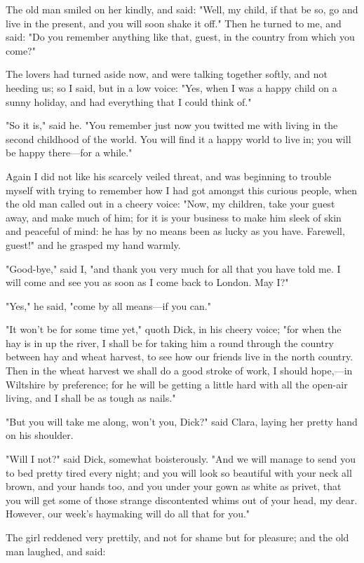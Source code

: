 The old man smiled on her kindly, and said: "Well, my child, if that be
so, go and live in the present, and you will soon shake it off." Then he
turned to me, and said: "Do you remember anything like that, guest, in
the country from which you come?"

The lovers had turned aside now, and were talking together softly, and
not heeding us; so I said, but in a low voice: "Yes, when I was a happy
child on a sunny holiday, and had everything that I could think of."

"So it is," said he. "You remember just now you twitted me with living
in the second childhood of the world. You will find it a happy world to
live in; you will be happy there---for a while."

Again I did not like his scarcely veiled threat, and was beginning to
trouble myself with trying to remember how I had got amongst this
curious people, when the old man called out in a cheery voice: "Now, my
children, take your guest away, and make much of him; for it is your
business to make him sleek of skin and peaceful of mind: he has by no
means been as lucky as you have. Farewell, guest!" and he grasped my
hand warmly.

"Good-bye," said I, "and thank you very much for all that you have told
me. I will come and see you as soon as I come back to London. May I?"

"Yes," he said, "come by all means---if you can."

"It won't be for some time yet," quoth Dick, in his cheery voice; "for
when the hay is in up the river, I shall be for taking him a round
through the country between hay and wheat harvest, to see how our
friends live in the north country. Then in the wheat harvest we shall do
a good stroke of work, I should hope,---in Wiltshire by preference; for
he will be getting a little hard with all the open-air living, and I
shall be as tough as nails."

"But you will take me along, won't you, Dick?" said Clara, laying her
pretty hand on his shoulder.

"Will I not?" said Dick, somewhat boisterously. "And we will manage to
send you to bed pretty tired every night; and you will look so beautiful
with your neck all brown, and your hands too, and you under your gown as
white as privet, that you will get some of those strange discontented
whims out of your head, my dear. However, our week's haymaking will do
all that for you."

The girl reddened very prettily, and not for shame but for pleasure; and
the old man laughed, and said:

